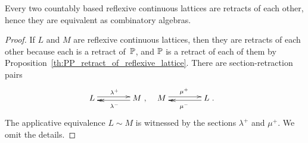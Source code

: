 \begin{corollary}
  \label{th:reflexive_lattices_equivalent}%
  Every two countably based reflexive continuous lattices are retracts 
  of each other, hence they are equivalent as combinatory algebras.
\end{corollary}

\begin{proof}
  If $L$ and $M$ are reflexive continuous lattices, then they are
  retracts of each other because each is a retract of~$\mathbb{P}$, and $\mathbb{P}$
  is a retract of each of them by
  Proposition~\ref{th:PP_retract_of_reflexive_lattice}.  There are
  section-retraction pairs
  \begin{align*}
    &\xymatrix@+1.5em{
      L \ar@<0.5ex>[r]^{\lambda^{+}} &
      M \ar@{->>}@<0.5ex>[l]^{\lambda^{-}}
      },
    &
    &\xymatrix@+1.5em{
      M \ar@<0.5ex>[r]^{\mu^{+}} &
      L \ar@{->>}@<0.5ex>[l]^{\mu^{-}}
      }.
  \end{align*}
  The applicative equivalence $L \sim M$ is witnessed by the sections
  $\lambda^{+}$ and $\mu^{+}$. We omit the details.
\end{proof}


